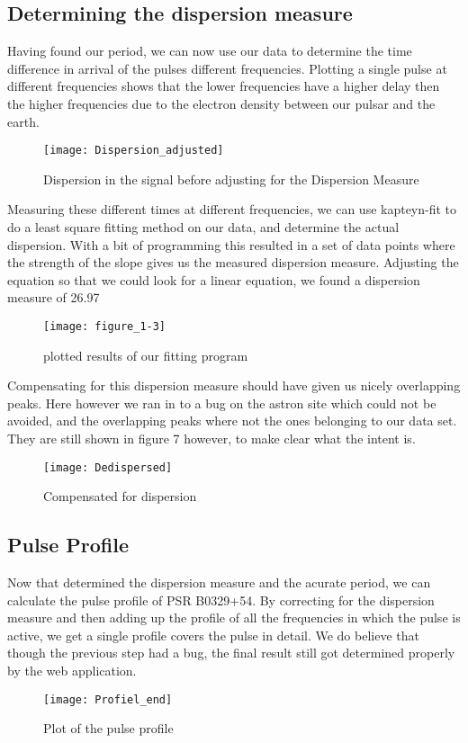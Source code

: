 \documentclass[twoside,twocolumn]{article}
\begin{document}
	\subsection{Determining the dispersion measure}
	Having found our period, we can now use our data to determine the time difference in arrival of the pulses different frequencies. Plotting a single pulse at different frequencies shows that the lower frequencies have a higher delay then the higher frequencies due to the electron density between our pulsar and the earth.  \cite{Spingola}
		\begin{figure}[h]
			\centering
			\texttt{[image: Dispersion\_adjusted]}
			\caption{Dispersion in the signal before adjusting for the Dispersion Measure}
			\label{Figure 5}
		\end{figure}
	
	Measuring these different times at different frequencies, we can use kapteyn-fit to do a least square fitting method on our data, and determine the actual dispersion. With a bit of programming this resulted in a set of data points where the strength of the slope gives us the measured dispersion measure. Adjusting the equation so that we could look for a linear equation, we found a dispersion measure of 26.97  

			\begin{figure}[h]
				\centering
				\texttt{[image: figure\_1-3]}
				\caption{plotted results of our fitting program}
				\label{Figure 6}
			\end{figure}
			
	Compensating for this dispersion measure should have given us nicely overlapping peaks. Here however we ran in to a bug on the astron site which could not be avoided, and the overlapping peaks where not the ones belonging to our data set. They are still shown in figure 7 however, to make clear what the intent is. 
	\begin{figure}[h]
		\centering
		\texttt{[image: Dedispersed]}
		\caption{Compensated for dispersion}
		\label{Figure 7}
	\end{figure}
	
	\subsection{Pulse Profile}
	Now that determined the dispersion measure and the acurate period, we can calculate the pulse profile of PSR B0329+54. By correcting for the dispersion measure and then adding up the profile of all the frequencies in which the pulse is active, we get a single profile covers the pulse in detail. We do believe that though the previous step had a bug, the final result still got determined properly by the web application.
		\begin{figure}[h]
			\centering
			\texttt{[image: Profiel\_end]}
			\caption{Plot of the pulse profile}
			\label{Figure 8}
		\end{figure}
		
\end{document}

